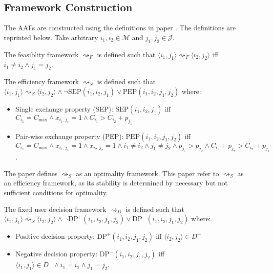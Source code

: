 \subsection{Framework Construction}

The AAFs are constructed using the definitions in paper \cite{aes}. The definitions are reprinted below. Take arbitrary $i_1,i_2\in\mathcal{M}$ and $j_1,j_2\in\mathcal{J}$.

\begin{definition}
	The feasiblity framework $\rightsquigarrow_F$ is defined such that $\langle i_1,j_1\rangle\rightsquigarrow_F\langle i_2,j_2\rangle$ iff $i_1\neq i_2\land j_1=j_2$.
\end{definition}

\begin{definition}
	The efficiency framework $\rightsquigarrow_S$ is defined such that $\langle i_1,j_1\rangle\rightsquigarrow_S\langle i_2,j_2\rangle\land\neg\text{SEP}(i_1,i_2,j_1)\lor\text{PEP}(i_1,i_2,j_1,j_2)$ where:
	\begin{itemize}
		\item Single exchange property (SEP): $\text{SEP}(i_1,i_2,j_1)$ iff $C_{i_1}=C_{\max}\land x_{i_1,j_1}=1\land C_{i_1}>C_{i_2}+p_{j_1}$
		\item Pair-wise exchange property (PEP): $\text{PEP}(i_1,i_2,j_1,j_2)$ iff $C_{i_1}=C_{\max}\land x_{i_1,j_1}=1\land x_{i_2,j_2}=1\land i_1\neq i_2\land j_1\neq j_2\land p_{j_1}>p_{j_2}\land C_{i_1}+p_{j_2}>C_{i_2}+p_{j_1}$.
	\end{itemize}

	The paper \cite{aes} defines $\rightsquigarrow_S$ as an optimality framework. This paper refer to $\rightsquigarrow_S$ as an efficiency framework, as its stability is determined by necessary but not sufficient conditions for optimality.
\end{definition}

\begin{definition}
	The fixed user decision framework $\rightsquigarrow_D$ is defined such that $\langle i_1,j_1\rangle\rightsquigarrow_S\langle i_2,j_2\rangle\land\neg\text{DP}^+(i_1,i_2,j_1,j_2)\lor\text{DP}^-(i_1,i_2,j_1,j_2)$ where:
	\begin{itemize}
		\item Positive decision property: $\text{DP}^+(i_1,i_2,j_1,j_2)$ iff $\langle i_2, j_2\rangle\in D^+$
		\item Negative decision property: $\text{DP}^-(i_1,i_2,j_1,j_2)$ iff $\langle i_1, j_1\rangle\in D^-\land i_1=i_2\land j_1=j_2$.
	\end{itemize}
\end{definition}


